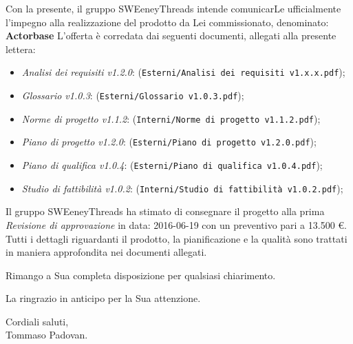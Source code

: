 \documentclass[a4paper]{article}
\begin{document}
	\vspace{5mm}Con la presente, il gruppo SWEeneyThreads intende comunicarLe ufficialmente l'impegno 
	alla realizzazione del prodotto da Lei commissionato, denominato: {\textbf{Actorbase}} \newline
	L'offerta è corredata dai seguenti documenti, allegati alla presente lettera:
	\begin{itemize}
		\item \emph{Analisi dei requisiti v1.2.0}: (\verb|Esterni/Analisi dei requisiti v1.x.x.pdf|);
		\item \emph{Glossario v1.0.3}: (\verb|Esterni/Glossario v1.0.3.pdf|);
		\item \emph{Norme di progetto v1.1.2}: (\verb|Interni/Norme di progetto v1.1.2.pdf|);
		\item \emph{Piano di progetto v1.2.0}: (\verb|Esterni/Piano di progetto v1.2.0.pdf|);
		\item \emph{Piano di qualifica v1.0.4}: (\verb|Esterni/Piano di qualifica v1.0.4.pdf|);
		\item \emph{Studio di fattibilità v1.0.2}: (\verb|Interni/Studio di fattibilità v1.0.2.pdf|);
	\end{itemize}
	Il gruppo SWEeneyThreads ha stimato di consegnare il progetto alla prima \emph{Revisione di approvazione}
	in data: 2016-06-19 con un preventivo pari a 13.500 \euro .
	Tutti i dettagli riguardanti il prodotto, la pianificazione e la qualità sono trattati in maniera approfondita 
	nei documenti allegati.
	\begin{flushleft}
	\vspace{2cm}
		Rimango a Sua completa disposizione per qualsiasi chiarimento.
	\end{flushleft}
	\begin{flushleft}
		La ringrazio in anticipo per la Sua attenzione.
	\end{flushleft}
	\vspace{5mm}
	\begin{center}
		Cordiali saluti,\\
		\vspace{1cm}Tommaso Padovan.
	\end{center}
	
\end{document}

